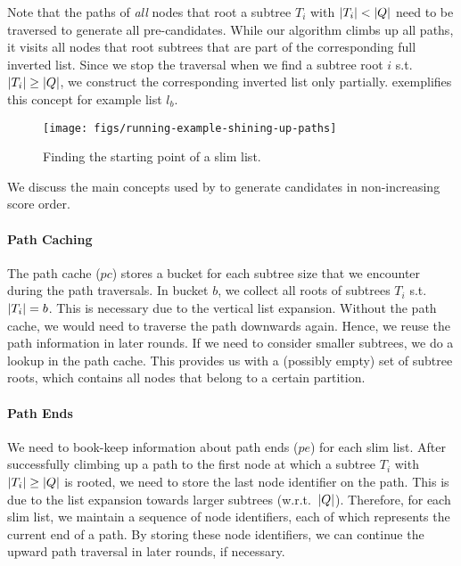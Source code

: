 Note that the paths of \emph{all} nodes that root a subtree $T_i$ with $\left| T_i \right| < \left| Q \right|$ need to be traversed to generate all pre-candidates. While our algorithm climbs up all paths, it visits all nodes that root subtrees that are part of the corresponding full inverted list. Since we stop the traversal when we find a subtree root $i$ s.t.\ $\left| T_i \right| \geq \left| Q \right|$, we construct the corresponding inverted list only partially.  exemplifies this concept for example list $l_b$.

\begin{figure}[t]
  \centering
  \texttt{[image: figs/running-example-shining-up-paths]}
  \caption{Finding the starting point of a slim list.}
  \label{fig:a-memory-efficient-approach-shining-up-paths}
\end{figure}

We discuss the main concepts used by \shincone{} to generate candidates in non-increasing score order.

\paragraph{Path Caching}

The path cache ($pc$) stores a bucket for each subtree size that we encounter during the path traversals. In bucket $b$, we collect all roots of subtrees $T_i$ s.t.\ $\left| T_i \right| = b$. This is necessary due to the vertical list expansion. Without the path cache, we would need to traverse the path downwards again. Hence, we reuse the path information in later rounds. If we need to consider smaller subtrees, we do a lookup in the path cache. This provides us with a (possibly empty) set of subtree roots, which contains all nodes that belong to a certain partition.

\paragraph{Path Ends}

We need to book-keep information about path ends ($pe$) for each slim list. After successfully climbing up a path to the first node at which a subtree $T_i$ with $\left| T_i \right| \geq \left| Q \right|$ is rooted, we need to store the last node identifier on the path. This is due to the list expansion towards larger subtrees (w.r.t.\ $\left| Q \right|$). Therefore, for each slim list, we maintain a sequence of node identifiers, each of which represents the current end of a path. By storing these node identifiers, we can continue the upward path traversal in later rounds, if necessary.

